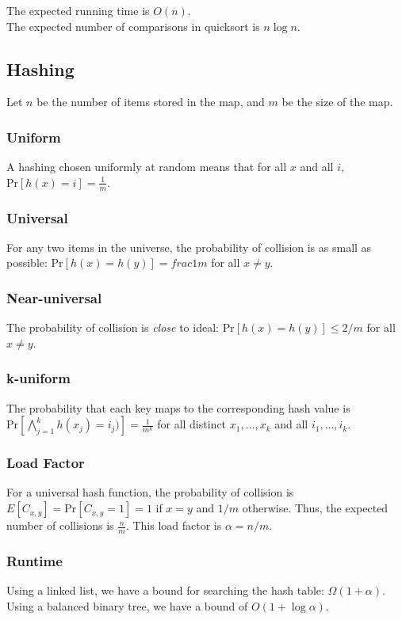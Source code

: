 The expected running time is $O(n)$.\\
The expected number of comparisons in quicksort is $n \log n$.


\subsection{Hashing}
Let $n$ be the number of items stored in the map, and $m$ be the size of the map.

\subsubsection{Uniform}
A hashing chosen uniformly at random means that for all $x$ and all $i$, $\text{Pr}[h(x) = i] = \frac{1}{m}$.

\subsubsection{Universal}
For any two items in the universe, the probability of collision is as small as possible: $\text{Pr}[h(x) = h(y)] = frac{1}{m}$ for all $x \neq y$.

\subsubsection{Near-universal}
The probability of collision is \emph{close} to ideal: $\text{Pr}[h(x) = h(y)] \leq 2/m$ for all $x \neq y$.

\subsubsection{k-uniform}
The probability that each key maps to the corresponding hash value is $\text{Pr}[\bigwedge_{j=1}^{k} h(x_j) = i_j)] = \frac{1}{m^{k}}$ for all distinct $x_1,\ldots,x_k$ and all $i_1,\ldots,i_k$.

\subsubsection{Load Factor}
For a universal hash function, the probability of collision is $E[C_{x, y}] = \text{Pr}[C_{x,y} = 1] = 1$ if $x = y$ and $1/m$ otherwise. Thus, the expected number of collisions is $\frac{n}{m}$. This load factor is $\alpha = n/m$.\\

\subsubsection{Runtime}
Using a linked list, we have a bound for searching the hash table: $\Omega(1 + \alpha)$. Using a balanced binary tree, we have a bound of $O(1 + \log \alpha)$.\\

